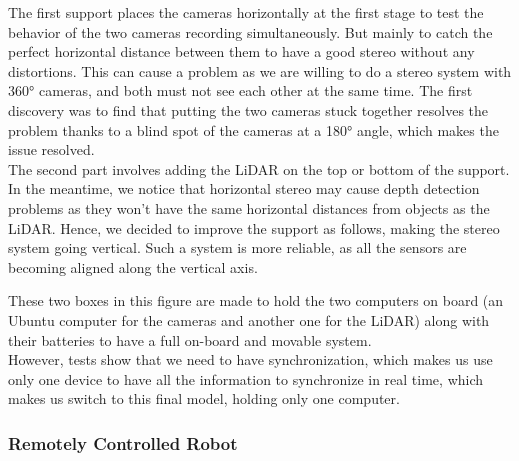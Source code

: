 \documentclass[english, LaM, oneside]{sapthesis}%
\begin{document}
The first support places the cameras horizontally at the first stage to test the behavior of the two cameras recording simultaneously.
But mainly to catch the perfect horizontal distance between them to have a good stereo without any distortions.
This can cause a problem as we are willing to do a stereo system with 360° cameras, and both must not see each other at the same time.
The first discovery was to find that putting the two cameras stuck together resolves the problem thanks to a blind spot of the cameras at a 180° angle, which makes the issue resolved.\\
The second part involves adding the LiDAR on the top or bottom of the support. In the meantime, we notice that horizontal stereo may cause depth detection problems as they won't have the same horizontal distances from objects as the LiDAR. 
Hence, we decided to improve the support as follows, making the stereo system going vertical.
Such a system is more reliable, as all the sensors are becoming aligned along the vertical axis.




These two boxes in this figure are made to hold the two computers on board (an Ubuntu computer for the cameras and another one for the LiDAR) along with their batteries to have a full on-board and movable system.\\
However, tests show that we need to have synchronization, which makes us use only one device to have all the information to synchronize in real time, which makes us switch to this final model, holding only one computer.

\subsubsection{Remotely Controlled Robot} \

\end{document}
